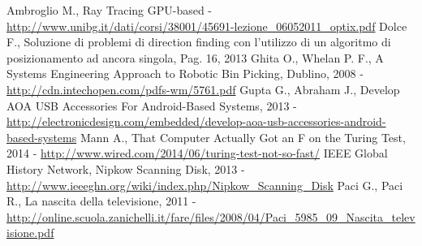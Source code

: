 \begin{thebibliography}{10}
\fancyfoot[C]{\thepage } 
Ambroglio M., Ray Tracing GPU-based - \url{http://www.unibg.it/dati/corsi/38001/45691-lezione_06052011_optix.pdf}
Dolce F., Soluzione di problemi di direction finding con l'utilizzo di un algoritmo di posizionamento ad ancora singola, Pag. 16, 2013
Ghita O., Whelan P. F., A Systems Engineering Approach to Robotic Bin Picking, Dublino, 2008 - \url{http://cdn.intechopen.com/pdfs-wm/5761.pdf}
Gupta G., Abraham J., Develop AOA USB Accessories For Android-Based Systems, 2013 - \url{http://electronicdesign.com/embedded/develop-aoa-usb-accessories-android-based-systems}
Mann A., That Computer Actually Got an F on the Turing Test, 2014 - \url{http://www.wired.com/2014/06/turing-test-not-so-fast/}
IEEE Global History Network, Nipkow Scanning Disk, 2013 - \url{http://www.ieeeghn.org/wiki/index.php/Nipkow_Scanning_Disk}
Paci G., Paci R., La nascita della televisione, 2011 - \url{http://online.scuola.zanichelli.it/fare/files/2008/04/Paci_5985_09_Nascita_televisione.pdf}

\end{thebibliography}